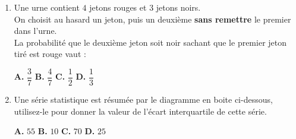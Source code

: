 \documentclass[a4paper,11pt]{article}
\begin{document}
\begin{seanceD}{}
\begin{enumerate}
\item Une urne contient $4$ jetons rouges et $3$ jetons noirs.\\On choisit au hasard un jeton, puis un deuxième \textbf{sans remettre} le premier dans l'urne.\\La probabilité que le deuxième jeton soit noir sachant que le premier jeton tiré est rouge vaut :

\begin{center}
\textbf{\textcolor{Couleur1}{A.}} $\dfrac{3}{7}$ \qquad \textbf{\textcolor{Couleur1}{B.}} $\dfrac{4}{7}$ \qquad \textbf{\textcolor{Couleur1}{C.}} $\dfrac{1}{2}$ \qquad \textbf{\textcolor{Couleur1}{D.}} $\dfrac{1}{3}$
\end{center}


\item Une série statistique est résumée par le diagramme en boite ci-dessous, utilisez-le pour donner la valeur de l'écart interquartile de cette série.\\
\begin{minipage}[c]{0.35\textwidth}
     \end{minipage}\hfill
\begin{minipage}[c]{0.65\textwidth}

\begin{center}
\textbf{\textcolor{Couleur1}{A.}} $55$ \qquad \textbf{\textcolor{Couleur1}{B.}} $10$ \qquad \textbf{\textcolor{Couleur1}{C.}} $70$ \qquad \textbf{\textcolor{Couleur1}{D.}} $25$
\end{center}
  \end{minipage}


\end{enumerate}
\end{seanceD}
\end{document}
